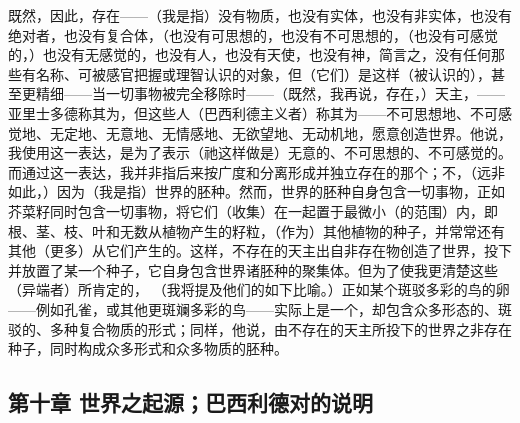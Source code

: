 既然，因此，存在——（我是指）没有物质，也没有实体，也没有非实体，也没有绝对者，也没有复合体，（也没有可思想的，也没有不可思想的，（也没有可感觉的，）也没有无感觉的，也没有人，也没有天使，也没有神，简言之，没有任何那些有名称、可被感官把握或理智认识的对象，但（它们）是这样（被认识的），甚至更精细——当一切事物被完全移除时——（既然，我再说，存在，）天主，——亚里士多德称其为，但这些人（巴西利德主义者）称其为——不可思想地、不可感觉地、无定地、无意地、无情感地、无欲望地、无动机地，愿意创造世界。他说，我使用这一表达，是为了表示（祂这样做是）无意的、不可思想的、不可感觉的。而通过这一表达，我并非指后来按广度和分离形成并独立存在的那个；不，（远非如此，）因为（我是指）世界的胚种。然而，世界的胚种自身包含一切事物，正如芥菜籽同时包含一切事物，将它们（收集）在一起置于最微小（的范围）内，即根、茎、枝、叶和无数从植物产生的籽粒，（作为）其他植物的种子，并常常还有其他（更多）从它们产生的。这样，不存在的天主出自非存在物创造了世界，投下并放置了某一个种子，它自身包含世界诸胚种的聚集体。但为了使我更清楚这些（异端者）所肯定的， （我将提及他们的如下比喻。）正如某个斑驳多彩的鸟的卵——例如孔雀，或其他更斑斓多彩的鸟——实际上是一个，却包含众多形态的、斑驳的、多种复合物质的形式；同样，他说，由不存在的天主所投下的世界之非存在种子，同时构成众多形式和众多物质的胚种。\par


\subsection{第十章 世界之起源；巴西利德对的说明}

